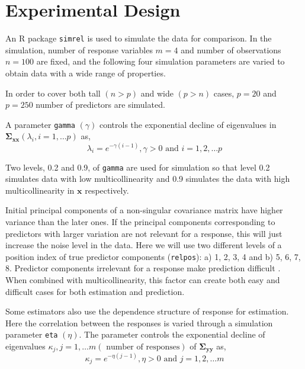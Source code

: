\documentclass[12pt,3p,authoryear]{elsarticle}
\providecommand{\tightlist}{%
  \setlength{\itemsep}{0pt}\setlength{\parskip}{0pt}}
\begin{document}
\hypertarget{experimental-design}{%
\section{Experimental Design}\label{experimental-design}}

An R \citep{coreR2018} package \texttt{simrel} \citep{Rimal2018, saebo2015simrel} is used to simulate the data for comparison. In the simulation, number of response variables \(m = 4\) and number of observations \(n = 100\) are fixed, and the following four simulation parameters are varied to obtain data with a wide range of properties.

\begin{description}
\tightlist
\item[\textbf{Number of predictors: (\texttt{p})}]
In order to cover both tall \((n>p)\) and wide \((p>n)\) cases, \(p= 20\) and \(p= 250\) number of predictors are simulated.
\item[\textbf{Multicollinearity in predictor variables: (\texttt{gamma})}]
A parameter \texttt{gamma} \((\gamma)\) controls the exponential decline of eigenvalues in \(\boldsymbol{\Sigma_{xx}} (\lambda_i, i = 1, \ldots p)\) as,
\begin{equation}
  \lambda_i = e^{-\gamma(i-1)}, \gamma > 0 \text{ and } i = 1, 2, \ldots p
  \label{eq:gamma}
  \end{equation}

Two levels, 0.2 and 0.9, of \texttt{gamma} are used for simulation so that level 0.2 simulates data with low multicollinearity and 0.9 simulates the data with high multicollinearity in \(\mathbf{x}\) respectively.
\item[\textbf{Position of relevant components: (\texttt{relpos})}]
Initial principal components of a non-singular covariance matrix have higher variance than the later ones. If the principal components corresponding to predictors with larger variation are not relevant for a response, this will just increase the noise level in the data. Here we will use two different levels of a position index of true predictor components (\texttt{relpos}): a) 1, 2, 3, 4 and b) 5, 6, 7, 8. Predictor components irrelevant for a response make prediction difficult \citep{Helland1994b}. When combined with multicollinearity, this factor can create both easy and difficult cases for both estimation and prediction.
\item[\textbf{Correlation in response variables: (\texttt{eta})}]
Some estimators also use the dependence structure of response for estimation. Here the correlation between the responses is varied through a simulation parameter \texttt{eta} \((\eta)\). The parameter controls the exponential decline of eigenvalues \(\kappa_j, j = 1, \ldots m (\text{ number of responses})\) of \(\boldsymbol{\Sigma_{yy}}\) as,
\begin{equation}
\kappa_j = e^{-\eta(j-1)}, \eta > 0 \text{ and } j = 1, 2, \ldots m
\label{eq:eta}
\end{equation}


\end{description}
\end{document}
